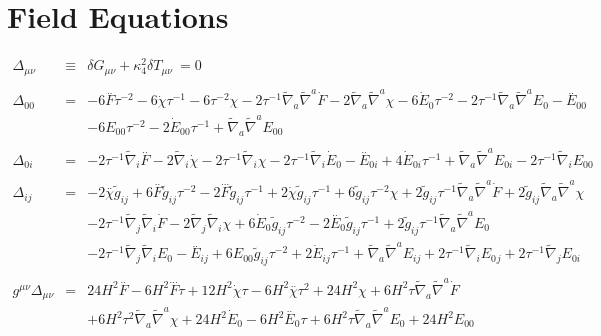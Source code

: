 \documentclass[10pt,letterpaper]{article}
\numberwithin{equation}{section}
\begin{document}
\section{Field Equations}
\begin{eqnarray}
\Delta_{\mu\nu} &\equiv& \delta G_{\mu\nu} +\kappa^2_4\delta T_{\mu\nu}\ =0
\\ \nonumber\\
\Delta_{00}&=& -6 \overset{..}{F} \tau^{-2} - 6 \dot{\chi} \tau^{-1} - 6 \tau^{-2} \chi - 2 \tau^{-1} \tilde{\nabla}_{a}\tilde{\nabla}^{a}\dot{F} - 2 \tilde{\nabla}_{a}\tilde{\nabla}^{a}\chi -6 \dot{E}_{0}{} \tau^{-2} - 2 \tau^{-1} \tilde{\nabla}_{a}\tilde{\nabla}^{a}E_{0}{}- \overset{..}{E}_{00}{} \nonumber \\ 
&& - 6 E_{00}{} \tau^{-2} - 2 \dot{E}_{00}{} \tau^{-1} + \tilde{\nabla}_{a}\tilde{\nabla}^{a}E_{00}{}
\\  \nonumber\\ 
\Delta_{0i}&=& -2 \tau^{-1} \tilde{\nabla}_{i}\overset{..}{F} - 2 \tilde{\nabla}_{i}\dot{\chi} - 2 \tau^{-1} \tilde{\nabla}_{i}\chi -2 \tau^{-1} \tilde{\nabla}_{i}\dot{E}_{0}{}- \overset{..}{E}_{0i}{} + 4 \dot{E}_{0i}{} \tau^{-1} + \tilde{\nabla}_{a}\tilde{\nabla}^{a}E_{0i}{} - 2 \tau^{-1} \tilde{\nabla}_{i}E_{00}{}
\\  \nonumber\\ 
\Delta_{ij}&=& -2 \overset{..}{\chi} \tilde{g}_{ij} + 6 \overset{..}{F} \tilde{g}_{ij} \tau^{-2} - 2 \overset{...}{F} \tilde{g}_{ij} \tau^{-1} + 2 \dot{\chi} \tilde{g}_{ij} \tau^{-1} + 6 \tilde{g}_{ij} \tau^{-2} \chi + 2 \tilde{g}_{ij} \tau^{-1} \tilde{\nabla}_{a}\tilde{\nabla}^{a}\dot{F} + 2 \tilde{g}_{ij} \tilde{\nabla}_{a}\tilde{\nabla}^{a}\chi \nonumber \\ 
&& - 2 \tau^{-1} \tilde{\nabla}_{j}\tilde{\nabla}_{i}\dot{F} - 2 \tilde{\nabla}_{j}\tilde{\nabla}_{i}\chi +6 \dot{E}_{0}{} \tilde{g}_{ij} \tau^{-2} - 2 \overset{..}{E}_{0}{} \tilde{g}_{ij} \tau^{-1} + 2 \tilde{g}_{ij} \tau^{-1} \tilde{\nabla}_{a}\tilde{\nabla}^{a}E_{0}{} \nonumber \\ 
&& - 2 \tau^{-1} \tilde{\nabla}_{j}\tilde{\nabla}_{i}E_{0}{}- \overset{..}{E}_{ij} + 6 E_{00}{} \tilde{g}_{ij} \tau^{-2} + 2 \dot{E}_{ij} \tau^{-1} + \tilde{\nabla}_{a}\tilde{\nabla}^{a}E_{ij} + 2 \tau^{-1} \tilde{\nabla}_{i}E_{0}{}_{j} + 2 \tau^{-1} \tilde{\nabla}_{j}E_{0i}{}
\\ \nonumber\\
g^{\mu\nu}\Delta_{\mu\nu} &=& 24 H^2 \overset{..}{F} - 6 H^2 \overset{...}{F} \tau + 12 H^2 \dot{\chi} \tau - 6 H^2 \overset{..}{\chi} \tau^2 + 24 H^2 \chi + 6 H^2 \tau \tilde{\nabla}_{a}\tilde{\nabla}^{a}\dot{F} \nonumber \\ 
&& + 6 H^2 \tau^2 \tilde{\nabla}_{a}\tilde{\nabla}^{a}\chi +24 H^2 \dot{E}_{0}{} - 6 H^2 \overset{..}{E}_{0}{} \tau + 6 H^2 \tau \tilde{\nabla}_{a}\tilde{\nabla}^{a}E_{0}{}+24 H^2 E_{00}{}
\end{eqnarray}
%
%
\\ \\
\end{document}
